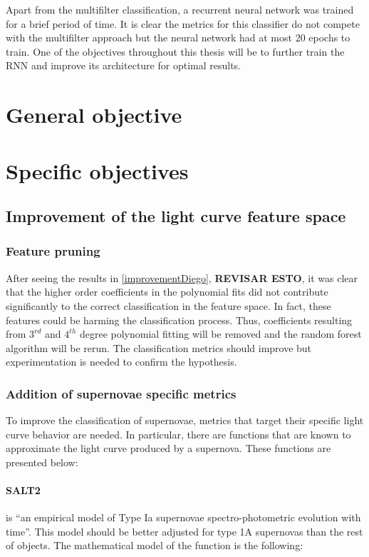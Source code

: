 Apart from the multifilter classification, a recurrent neural network was trained for a brief period of time. It is clear the metrics for this classifier do not compete with the multifilter approach but the neural network had at most 20 epochs to train. One of the objectives throughout this thesis will be to further train the RNN and improve its architecture for optimal results.


\section{General objective}



\section{Specific objectives}

\subsection{Improvement of the light curve feature space}

\subsubsection{Feature pruning}

After seeing the results in \ref{improvementDiego}, \textbf{REVISAR ESTO}, it was clear that the higher order coefficients in the polynomial fits did not contribute significantly to the correct classification in the feature space. In fact, these features could be harming the classification process. Thus, coefficients resulting from $3^{rd}$ and $4^{th}$ degree polynomial fitting will be removed and the random forest algorithm will be rerun. The classification metrics should improve but experimentation is needed to confirm the hypothesis.  

\subsubsection{Addition of supernovae specific metrics}

To improve the classification of supernovae, metrics that target their specific light curve behavior are needed. In particular, there are functions that are known to approximate the light curve produced by a supernova. These functions are presented below: 

\paragraph{SALT2} is ``an empirical model of Type Ia supernovae spectro-photometric evolution with time''\cite{salt2}. This model should be better adjusted for type 1A supernovas than the rest of objects. The mathematical model of the function is the following\cite{salt2}:

